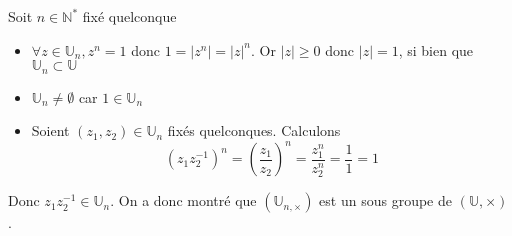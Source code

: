 \documentclass{article}
\begin{document}
Soit $n \in \mathbb{N}^{*}$ fixé quelconque
\begin{itemize}[label=$\star$]
	\item $\forall z \in \mathbb{U}_{n}, z^{n} = 1$ donc $1 = \lvert  z^{n} \rvert = \lvert z \rvert^{n}$. Or $\lvert z \rvert \geqslant 0$ donc $\lvert z \rvert = 1$, si bien que $\mathbb{U}_{n} \subset \mathbb{U}$

	\item $\mathbb{U}_{n} \neq \emptyset$ car $1 \in \mathbb{U}_{n}$

	\item Soient $(z_{1}, z_{2}) \in \mathbb{U}_{n}$ fixés quelconques.
	      Calculons
	      $$
		      (z_{1}z_{2}^{-1})^{n} = \left( \frac{z_{1}}{z_{2}} \right)^{n} = \frac{z_{1}^{n}}{z_{2}^{n}} = \frac{1}{1} = 1
	      $$
\end{itemize}
Donc $z_{1}z_{2}^{-1} \in \mathbb{U}_{n}$. On a donc montré que $(\mathbb{U}_{n, \times})$ est un sous groupe de $(\mathbb{U}, \times)$.
\end{document}
